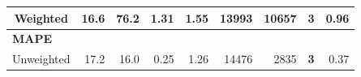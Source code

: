 \documentclass[a4paper,fleqn]{cas-sc}
\begin{document}
\begin{table}[]
\begin{tabular}{crrrrrrrr}
Weighted                                                                                                   & 16.6                                                                                   & 76.2                                                                                        & 1.31                                                                            & 1.55                                                                                          & 13993                                                                                     & 10657                                                                                              & 3                                                                                       & 0.96                                                                                   \\ \hline
\multicolumn{9}{l}{\textbf{MAPE}}                                                                                                                                                                                                                                                                                                                                                                                                                                                                                                                                                                                                                                                                                                                                                                                                                                       \\
Unweighted                                                                                                 & 17.2                                                                                   & 16.0                                                                                        & 0.25                                                                            & 1.26                                                                                          & 14476                                                                                     & 2835                                                                                               & \textbf{3}                                                                              & 0.37                                                                                   \\

\end{tabular}
\end{table}
\end{document}

